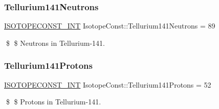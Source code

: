 \subsubsection{\texorpdfstring{Tellurium141\+Neutrons}{Tellurium141Neutrons}}
{\footnotesize\ttfamily \mbox{\hyperlink{group___isotope_const-_macros_ga5f18360b3e99483a35c32d789e62621c}{I\+S\+O\+T\+O\+P\+E\+C\+O\+N\+S\+T\+\_\+\+I\+NT}} Isotope\+Const\+::\+Tellurium141\+Neutrons = 89}

\$ \$ Neutrons in Tellurium-\/141. \mbox{\label{group___isotope_const-_tellurium-_te141_ga631896769483d14cbe433d7431c13224}} 
\subsubsection{\texorpdfstring{Tellurium141\+Protons}{Tellurium141Protons}}
{\footnotesize\ttfamily \mbox{\hyperlink{group___isotope_const-_macros_ga5f18360b3e99483a35c32d789e62621c}{I\+S\+O\+T\+O\+P\+E\+C\+O\+N\+S\+T\+\_\+\+I\+NT}} Isotope\+Const\+::\+Tellurium141\+Protons = 52}

\$ \$ Protons in Tellurium-\/141. 